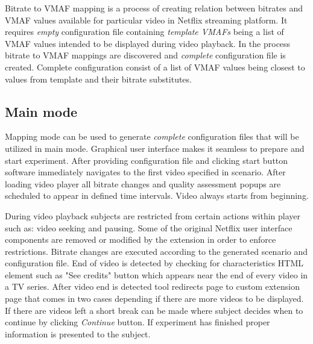         Bitrate to VMAF mapping is a process of creating relation between bitrates and VMAF values available for particular video in Netflix streaming platform. It requires \textit{empty} configuration file containing \textit{template VMAFs} being a list of VMAF values intended to be displayed during video playback. In the process bitrate to VMAF mappings are discovered and \textit{complete} configuration file is created. Complete configuration consist of a list of VMAF values being closest to values from template and their bitrate substitutes.

            
    \subsection{Main mode}
        Mapping mode can be used to generate \textit{complete} configuration files that will be utilized in main mode. Graphical user interface makes it seamless to prepare and start experiment. After providing configuration file and clicking start button software immediately navigates to the first video specified in scenario. After loading video player all bitrate changes and quality assessment popups are scheduled to appear in defined time intervals. Video always starts from beginning. 
    
        During video playback subjects are restricted from certain actions within player such as: video seeking and pausing. Some of the original Netflix user interface components are removed or modified by the extension in order to enforce restrictions.
        Bitrate changes are executed according to the generated scenario and configuration file. End of video is detected by checking for characteristics HTML element such as "See credits" button which appears near the end of every video in a TV series. After video end is detected tool redirects page to custom extension page that comes in two cases depending if there are more videos to be displayed. If there are videos left a short break can be made where subject decides when to continue by clicking \textit{Continue} button. If experiment has finished proper information is presented to the subject.

